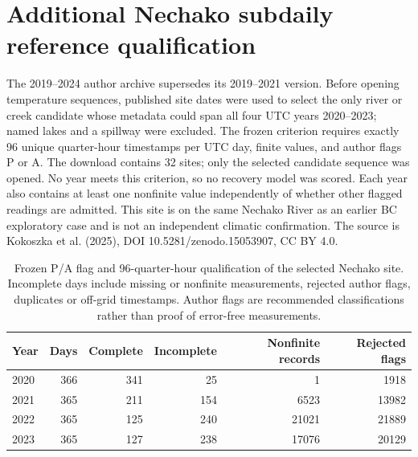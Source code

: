 \section{Additional Nechako subdaily reference qualification}
The 2019--2024 author archive supersedes its 2019--2021 version. Before opening temperature sequences, published site dates were used to select the only river or creek candidate whose metadata could span all four UTC years 2020--2023; named lakes and a spillway were excluded. The frozen criterion requires exactly 96 unique quarter-hour timestamps per UTC day, finite values, and author flags P or A. The download contains 32 sites; only the selected candidate sequence was opened. No year meets this criterion, so no recovery model was scored. Each year also contains at least one nonfinite value independently of whether other flagged readings are admitted. This site is on the same Nechako River as an earlier BC exploratory case and is not an independent climatic confirmation. The source is Kokoszka et al. (2025), DOI 10.5281/zenodo.15053907, CC BY 4.0.
\begin{table}[p]\centering\small
\caption{Frozen P/A flag and 96-quarter-hour qualification of the selected Nechako site. Incomplete days include missing or nonfinite measurements, rejected author flags, duplicates or off-grid timestamps. Author flags are recommended classifications rather than proof of error-free measurements.}\label{tab:nechako-reference}
\begin{tabular}{lrrrrr}\toprule
Year & Days & Complete & Incomplete & Nonfinite records & Rejected flags\\\midrule
2020 & 366 & 341 & 25 & 1 & 1918\\
2021 & 365 & 211 & 154 & 6523 & 13982\\
2022 & 365 & 125 & 240 & 21021 & 21889\\
2023 & 365 & 127 & 238 & 17076 & 20129\\
\bottomrule\end{tabular}
\end{table}
